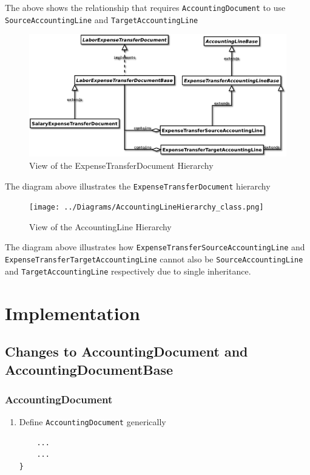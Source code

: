 \documentclass[12pt,notitlepage]{article}
\begin{document}
  The above shows the relationship that requires \verb|AccountingDocument| to use \verb|SourceAccountingLine|
  and \verb|TargetAccountingLine|
  \newpage
  \begin{figure}[!h]
    \caption{View of the ExpenseTransferDocument Hierarchy}
    \includegraphics[bb=25 250 400 450]{../Diagrams/ExpenseTransferDocumentHierarchy_class.png}
  \end{figure}
  The diagram above illustrates the \verb|ExpenseTransferDocument| hierarchy

  \begin{figure}[!h]
    \caption{View of the AccountingLine Hierarchy}
    \texttt{[image: ../Diagrams/AccountingLineHierarchy\_class.png]}
  \end{figure}
  The diagram above illustrates how \verb|ExpenseTransferSourceAccountingLine| and \verb|ExpenseTransferTargetAccountingLine|
  cannot also be \verb|SourceAccountingLine| and \verb|TargetAccountingLine| respectively due to single inheritance.

  \section{Implementation}
  \subsection{Changes to AccountingDocument and AccountingDocumentBase}
  \subsubsection{AccountingDocument}
  \begin{enumerate}
    \item Define \verb|AccountingDocument| generically
      
      \begin{lstlisting}
    ...
    ...
}
  \end{lstlisting}

  \end{enumerate}
\end{document}
